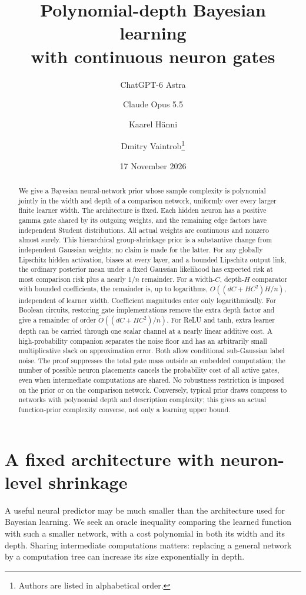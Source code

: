 \documentclass[11pt]{article}
\title{Polynomial-depth Bayesian learning\\with continuous neuron gates}
\author{ChatGPT-6 Astra \and Claude Opus 5.5 \and Kaarel H\"anni \and
Dmitry Vaintrob\thanks{Authors are listed in alphabetical order.}}
\date{17 November 2026}
\theoremstyle{remark}\newtheorem{remark}[theorem]{Remark}
\begin{document}
\maketitle
\begin{abstract}
We give a Bayesian neural-network prior whose sample complexity is polynomial jointly in the width and depth of a comparison network, uniformly over every larger finite learner width. The architecture is fixed. Each hidden neuron has a positive gamma gate shared by its outgoing weights, and the remaining edge factors have independent Student distributions. All actual weights are continuous and nonzero almost surely. This hierarchical group-shrinkage prior is a substantive change from independent Gaussian weights; no claim is made for the latter. For any globally Lipschitz hidden activation, biases at every layer, and a bounded Lipschitz output link, the ordinary posterior mean under a fixed Gaussian likelihood has expected risk at most comparison risk plus a nearly $1/n$ remainder. For a width-$C$, depth-$H$ comparator with bounded coefficients, the remainder is, up to logarithms, $O((dC+HC^2)H/n)$, independent of learner width. Coefficient magnitudes enter only logarithmically. For Boolean circuits, restoring gate implementations remove the extra depth factor and give a remainder of order $\widetilde O((dC+HC^2)/n)$. For ReLU and tanh, extra learner depth can be carried through one scalar channel at a nearly linear additive cost. A high-probability companion separates the noise floor and has an arbitrarily small multiplicative slack on approximation error. Both allow conditional sub-Gaussian label noise. The proof suppresses the total gate mass outside an embedded computation; the number of possible neuron placements cancels the probability cost of all active gates, even when intermediate computations are shared. No robustness restriction is imposed on the prior or on the comparison network. Conversely, typical prior draws compress to networks with polynomial depth and description complexity; this gives an actual function-prior complexity converse, not only a learning upper bound.
\end{abstract}

\section{A fixed architecture with neuron-level shrinkage}
A useful neural predictor may be much smaller than the architecture used for Bayesian learning. We seek an oracle inequality comparing the learned function with such a smaller network, with a cost polynomial in both its width and its depth. Sharing intermediate computations matters: replacing a general network by a computation tree can increase its size exponentially in depth.
\end{document}
